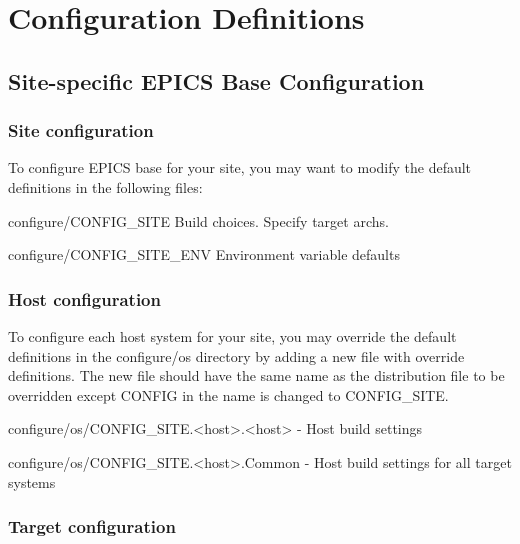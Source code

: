 \section{Configuration Definitions}

\subsection{Site-specific EPICS Base Configuration}

\subsubsection{Site configuration}

To configure EPICS base for your site, you may want to modify the default definitions in the following files:

\begin{description}\item configure/CONFIG\_SITE          Build choices. Specify target archs.

\item configure/CONFIG\_SITE\_ENV Environment variable defaults

\end{description}\subsubsection{Host configuration}

To configure each host system for your site, you may override the default definitions in the configure/os directory by 
adding a new file with override definitions. The new file should have the same name as the distribution file to be 
overridden except CONFIG in the name is changed to CONFIG\_SITE.

\begin{description}\item configure/os/CONFIG\_SITE.\textless{}host\textgreater{}.\textless{}host\textgreater{}    - Host build settings

\item configure/os/CONFIG\_SITE.\textless{}host\textgreater{}.Common - Host build settings for all target systems

\end{description}\subsubsection{Target configuration}

